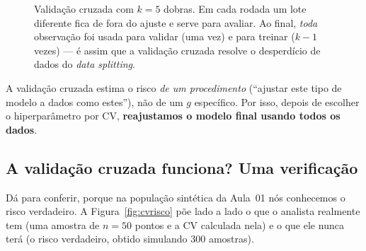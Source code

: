 \documentclass[11pt,a4paper]{article}
\begin{document}
\begin{figure}[htbp]
  \centering
  \caption{Validação cruzada com $k=5$ dobras. Em cada rodada um lote diferente fica
  de fora do ajuste e serve para avaliar. Ao final, \emph{toda} observação foi usada
  para validar (uma vez) e para treinar ($k-1$ vezes) --- é assim que a validação
  cruzada resolve o desperdício de dados do \emph{data splitting}.}
  \label{fig:kfold}
\end{figure}

\begin{ideia}
A validação cruzada estima o risco \emph{de um procedimento} (``ajustar este tipo
de modelo a dados como estes''), não de um $g$ específico. Por isso, depois de
escolher o hiperparâmetro por CV, \textbf{reajustamos o modelo final usando todos
os dados}.
\end{ideia}

\subsection{A validação cruzada funciona? Uma verificação}
Dá para conferir, porque na população sintética da Aula~01 nós conhecemos o risco
verdadeiro. A Figura~\ref{fig:cvrisco} põe lado a lado o que o analista realmente
tem (uma amostra de $n=50$ pontos e a CV calculada nela) e o que ele nunca terá (o
risco verdadeiro, obtido simulando 300 amostras).
\end{document}
